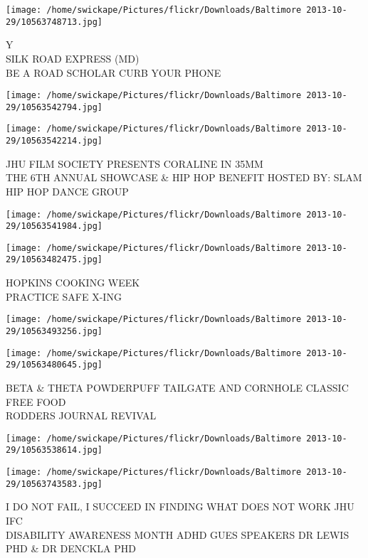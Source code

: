 \documentclass[10pt,letterpaper]{article}
\begin{document}
\vspace{0.25in}
\texttt{[image: /home/swickape/Pictures/flickr/Downloads/Baltimore 2013-10-29/10563748713.jpg]}

Y\\
SILK ROAD EXPRESS (MD)\\
BE A ROAD SCHOLAR CURB YOUR PHONE\\
\pagebreak

\texttt{[image: /home/swickape/Pictures/flickr/Downloads/Baltimore 2013-10-29/10563542794.jpg]}

\vspace{0.25in}
\texttt{[image: /home/swickape/Pictures/flickr/Downloads/Baltimore 2013-10-29/10563542214.jpg]}

JHU FILM SOCIETY PRESENTS CORALINE IN 35MM\\
THE 6TH ANNUAL SHOWCASE \& HIP HOP BENEFIT HOSTED BY: SLAM HIP HOP DANCE GROUP\\
\pagebreak

\texttt{[image: /home/swickape/Pictures/flickr/Downloads/Baltimore 2013-10-29/10563541984.jpg]}

\vspace{0.25in}
\texttt{[image: /home/swickape/Pictures/flickr/Downloads/Baltimore 2013-10-29/10563482475.jpg]}

HOPKINS COOKING WEEK\\
PRACTICE SAFE X{-}ING\\
\pagebreak

\texttt{[image: /home/swickape/Pictures/flickr/Downloads/Baltimore 2013-10-29/10563493256.jpg]}

\vspace{0.25in}
\texttt{[image: /home/swickape/Pictures/flickr/Downloads/Baltimore 2013-10-29/10563480645.jpg]}

BETA \& THETA POWDERPUFF TAILGATE AND CORNHOLE CLASSIC FREE FOOD\\
RODDERS JOURNAL REVIVAL\\
\pagebreak

\texttt{[image: /home/swickape/Pictures/flickr/Downloads/Baltimore 2013-10-29/10563538614.jpg]}

\vspace{0.25in}
\texttt{[image: /home/swickape/Pictures/flickr/Downloads/Baltimore 2013-10-29/10563743583.jpg]}

I DO NOT FAIL, I SUCCEED IN FINDING WHAT DOES NOT WORK JHU IFC\\
DISABILITY AWARENESS MONTH ADHD GUES SPEAKERS DR LEWIS PHD \& DR DENCKLA PHD\\
\pagebreak
\end{document}
